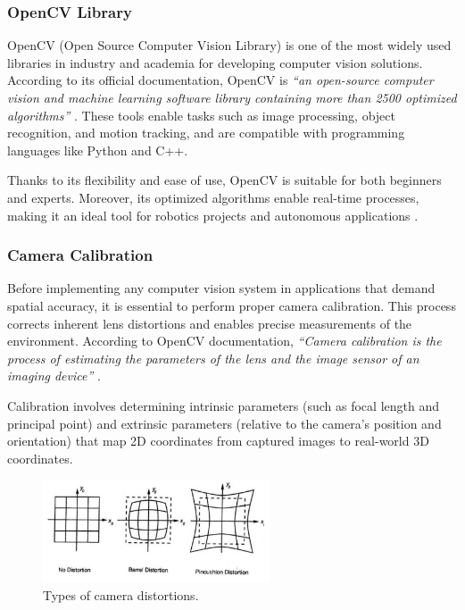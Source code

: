     \subsubsection{OpenCV Library}
    
    OpenCV (Open Source Computer Vision Library) is one of the most widely used libraries in industry and academia for developing computer vision solutions. According to its official documentation, OpenCV is \textit{“an open-source computer vision and machine learning software library containing more than 2500 optimized algorithms”} \cite{opencv_docs}. These tools enable tasks such as image processing, object recognition, and motion tracking, and are compatible with programming languages like Python and C++.  
    
    Thanks to its flexibility and ease of use, OpenCV is suitable for both beginners and experts. Moreover, its optimized algorithms enable real-time processes, making it an ideal tool for robotics projects and autonomous applications \cite{opencv_docs}.  
    
    \subsubsection{Camera Calibration}
    
    Before implementing any computer vision system in applications that demand spatial accuracy, it is essential to perform proper camera calibration. This process corrects inherent lens distortions and enables precise measurements of the environment. According to OpenCV documentation, \textit{“Camera calibration is the process of estimating the parameters of the lens and the image sensor of an imaging device”} \cite{opencv_calib3d}.  
    
    Calibration involves determining intrinsic parameters (such as focal length and principal point) and extrinsic parameters (relative to the camera's position and orientation) that map 2D coordinates from captured images to real-world 3D coordinates.  
    
    \begin{figure}[H] 
        \centering 
        \includegraphics[width=0.6\textwidth]{pictures/distortions.png} %
        \caption{Types of camera distortions.} 
        \label{fig:distortions} 
    \end{figure}  
    
